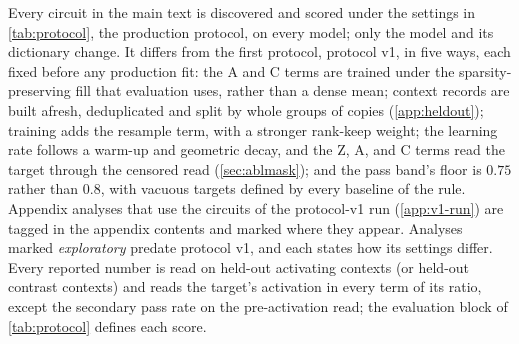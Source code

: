 \documentclass[10pt]{article}
\begin{document}
Every circuit in the main text is discovered and scored under the settings in \cref{tab:protocol}, the production protocol, on every model; only the model and its dictionary change.
It differs from the first protocol, protocol v1, in five ways, each fixed before any production fit: the A and C terms are trained under the sparsity-preserving fill that evaluation uses, rather than a dense mean; context records are built afresh, deduplicated and split by whole groups of copies (\cref{app:heldout}); training adds the resample term, with a stronger rank-keep weight; the learning rate follows a warm-up and geometric decay, and the Z, A, and C terms read the target through the censored read (\cref{sec:ablmask}); and the pass band's floor is $0.75$ rather than $0.8$, with vacuous targets defined by every baseline of the rule.
Appendix analyses that use the circuits of the protocol-v1 run (\cref{app:v1-run}) are tagged in the appendix contents and marked where they appear.
Analyses marked \emph{exploratory} predate protocol v1, and each states how its settings differ.
Every reported number is read on held-out activating contexts (or held-out contrast contexts) and reads the target's activation in every term of its ratio, except the secondary pass rate on the pre-activation read; the evaluation block of \cref{tab:protocol} defines each score.
\end{document}
